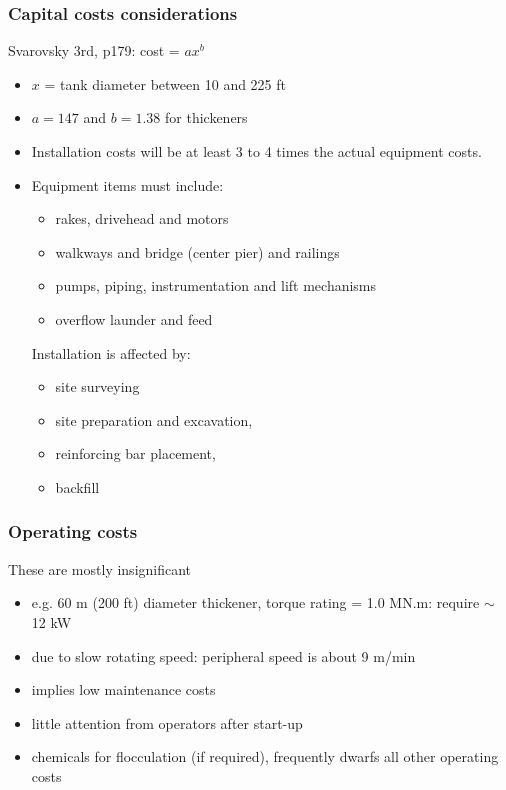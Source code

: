 \begin{frame}\frametitle{Capital costs considerations}
	Svarovsky 3rd, p179: cost = $a x^b$
	\begin{itemize}
		\item	$x$ = tank diameter between 10 and 225 ft
		\item	$a=147$ and $b=1.38$ for thickeners
	\end{itemize}
	
	\begin{itemize}
		\item	Installation costs will be at least 3 to 4 times the actual equipment costs.
		\item	Equipment items must include:
		\begin{itemize}
			\item	rakes, drivehead and motors
			\item	walkways and bridge (center pier) and railings
			\item	pumps, piping, instrumentation and lift mechanisms
			\item	overflow launder and feed 
		\end{itemize}
		Installation is affected by:
		\begin{itemize}			
			\item	site surveying
			\item	site preparation and excavation, 
			\item	reinforcing bar placement, 
			\item	backfill			
		\end{itemize}		
	\end{itemize}	
\end{frame}

\begin{frame}\frametitle{Operating costs}
	These are mostly insignificant
	\begin{itemize}
		\item	e.g. 60 m (200 ft) diameter thickener, torque rating = 1.0 MN.m: require $\sim$ 12 kW
		\item	due to slow rotating speed: peripheral speed is about 9 m/min 
		\item	implies low maintenance costs
		\item	little attention from operators after start-up
		\item	chemicals for flocculation (if required), frequently dwarfs all other operating costs 
	\end{itemize}
\end{frame}

